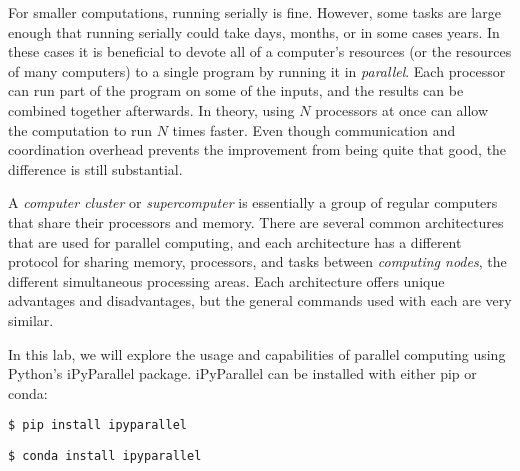 \begin{comment} %
This can be visualized as a program that runs all of its computations on a single processor or core.
Figure \ref{fig:htop} visualizes what this would look like by using the Linux command \li{htop}.
This command shows which programs are running, how many resources they are using up, and how much each processor core is running.

\begin{figure}[!tbp]
  \begin{subfigure}[b]{0.49\textwidth}
    \texttt{[image: figures/activenew.jpg]}
    \caption{Serial}
  \end{subfigure}
  \hfill
  \begin{subfigure}[b]{0.49\textwidth}
    \texttt{[image: figures/cluster\_activenew.jpg]}
    \caption{Parallel}
  \end{subfigure}
  \caption{In the serial implementation, one core is running the program. In the parallel, it is split across all cores.}
  \label{fig:htop}
\end{figure}
\end{comment}

For smaller computations, running serially is fine.
However, some tasks are large enough that running serially could take days, months, or in some cases years.
In these cases it is beneficial to devote all of a computer's resources (or the resources of many computers) to a single program by running it in \emph{parallel}.
Each processor can run part of the program on some of the inputs, and the results can be combined together afterwards.
In theory, using $N$ processors at once can allow the computation to run $N$ times faster.
Even though communication and coordination overhead prevents the improvement from being quite that good, the difference is still substantial.

A \emph{computer cluster} or \emph{supercomputer} is essentially a group of regular computers that share their processors and memory.
There are several common architectures that are used for parallel computing, and each architecture has a different protocol for sharing memory, processors, and tasks between \emph{computing nodes}, the different simultaneous processing areas.
Each architecture offers unique advantages and disadvantages, but the general commands used with each are very similar.

In this lab, we will explore the usage and capabilities of parallel computing using Python's iPyParallel package.
iPyParallel can be installed with either pip or conda:
\begin{lstlisting}
$ pip install ipyparallel
\end{lstlisting}
\begin{lstlisting}
$ conda install ipyparallel
\end{lstlisting}

